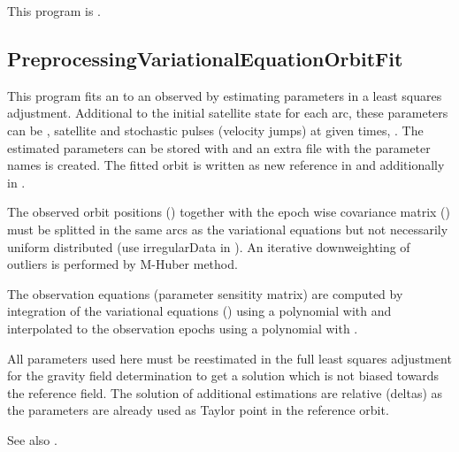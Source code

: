 This program is .
\clearpage
\subsection{PreprocessingVariationalEquationOrbitFit}\label{PreprocessingVariationalEquationOrbitFit}
This program fits an  to an observed  by estimating parameters
in a least squares adjustment. Additional to the initial satellite state for each arc, these parameters can be
, satellite 
and stochastic pulses (velocity jumps) at given times, . The estimated parameters can be stored with
 and an extra file with the parameter names is created. The fitted orbit is written
as new reference in  and additionally in .

The observed orbit positions () together with the epoch wise covariance matrix
() must be splitted in the same arcs as the variational equations but not
necessarily uniform distributed (use irregularData in ). An iterative downweighting of
outliers is performed by M-Huber method.

The observation equations (parameter sensitity matrix) are computed by integration of the variational equations
() using a polynomial with  and interpolated to the
observation epochs using a polynomial with .

All parameters used here must be reestimated in the full least squares adjustment
for the gravity field determination to get a solution which is not biased towards the reference field.
The solution of additional estimations are relative (deltas) as the parameters are already used as Taylor point
in the reference orbit.

See also .


